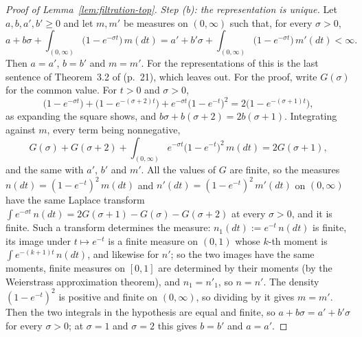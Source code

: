 \begin{proof}[Proof of Lemma~\ref{lem:filtration-top}]
\emph{Step (b): the representation is unique.} Let $a, b, a', b' \ge 0$ and let $m, m'$ be measures
on $(0,\infty)$ such that, for every $\sigma > 0$,
\[
  a + b\sigma + \int_{(0,\infty)}\bigl(1 - e^{-\sigma t}\bigr)\,m(dt)
  = a' + b'\sigma + \int_{(0,\infty)}\bigl(1 - e^{-\sigma t}\bigr)\,m'(dt) < \infty .
\]
Then $a = a'$, $b = b'$ and $m = m'$. For the representations of  this is the last
sentence of Theorem~3.2 of  (p.~21), which  leaves out.
For the proof, write $G(\sigma)$ for the common value. For $t > 0$ and $\sigma > 0$,
\[
  \bigl(1 - e^{-\sigma t}\bigr) + \bigl(1 - e^{-(\sigma+2)t}\bigr)
  + e^{-\sigma t}\bigl(1 - e^{-t}\bigr)^2 = 2\bigl(1 - e^{-(\sigma+1)t}\bigr),
\]
as expanding the square shows, and $b\sigma + b(\sigma + 2) = 2b(\sigma + 1)$. Integrating against
$m$, every term being nonnegative,
\[
  G(\sigma) + G(\sigma + 2) + \int_{(0,\infty)} e^{-\sigma t}\bigl(1 - e^{-t}\bigr)^2\,m(dt)
  = 2G(\sigma + 1),
\]
and the same with $a'$, $b'$ and $m'$. All the values of $G$ are finite, so the measures
$n(dt) = (1 - e^{-t})^2\,m(dt)$ and $n'(dt) = (1 - e^{-t})^2\,m'(dt)$ on $(0,\infty)$ have the same
Laplace transform $\int e^{-\sigma t}\,n(dt) = 2G(\sigma+1) - G(\sigma) - G(\sigma+2)$ at every
$\sigma > 0$, and it is finite. Such a transform determines the measure: $n_1(dt) := e^{-t}\,n(dt)$
is finite, its image under $t \mapsto e^{-t}$ is a finite measure on $(0,1)$ whose $k$-th moment is
$\int e^{-(k+1)t}\,n(dt)$, and likewise for $n'$; so the two images have the same moments, finite
measures on $[0,1]$ are determined by their moments (by the Weierstrass approximation theorem), and
$n_1 = n'_1$, so $n = n'$. The density $(1 - e^{-t})^2$ is positive and finite on
$(0,\infty)$, so dividing by it gives $m = m'$. Then the two integrals in the hypothesis are equal
and finite, so $a + b\sigma = a' + b'\sigma$ for every $\sigma > 0$; at $\sigma = 1$ and $\sigma = 2$
this gives $b = b'$ and $a = a'$.


\end{proof}
